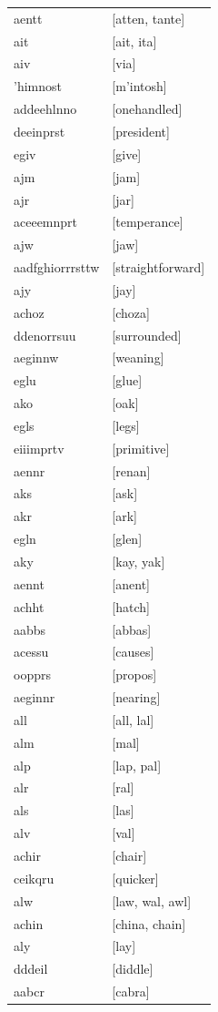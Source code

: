 \documentclass{article}
\begin{document}
\begin{tabular}{ll}
aentt & [atten, tante] \\
ait & [ait, ita] \\
aiv & [via] \\
'himnost & [m'intosh] \\
addeehlnno & [onehandled] \\
deeinprst & [president] \\
egiv & [give] \\
ajm & [jam] \\
ajr & [jar] \\
aceeemnprt & [temperance] \\
ajw & [jaw] \\
aadfghiorrrsttw & [straightforward] \\
ajy & [jay] \\
achoz & [choza] \\
ddenorrsuu & [surrounded] \\
aeginnw & [weaning] \\
eglu & [glue] \\
ako & [oak] \\
egls & [legs] \\
eiiimprtv & [primitive] \\
aennr & [renan] \\
aks & [ask] \\
akr & [ark] \\
egln & [glen] \\
aky & [kay, yak] \\
aennt & [anent] \\
achht & [hatch] \\
aabbs & [abbas] \\
acessu & [causes] \\
oopprs & [propos] \\
aeginnr & [nearing] \\
all & [all, lal] \\
alm & [mal] \\
alp & [lap, pal] \\
alr & [ral] \\
als & [las] \\
alv & [val] \\
achir & [chair] \\
ceikqru & [quicker] \\
alw & [law, wal, awl] \\
achin & [china, chain] \\
aly & [lay] \\
dddeil & [diddle] \\
aabcr & [cabra] \\

\end{tabular}
\end{document}
